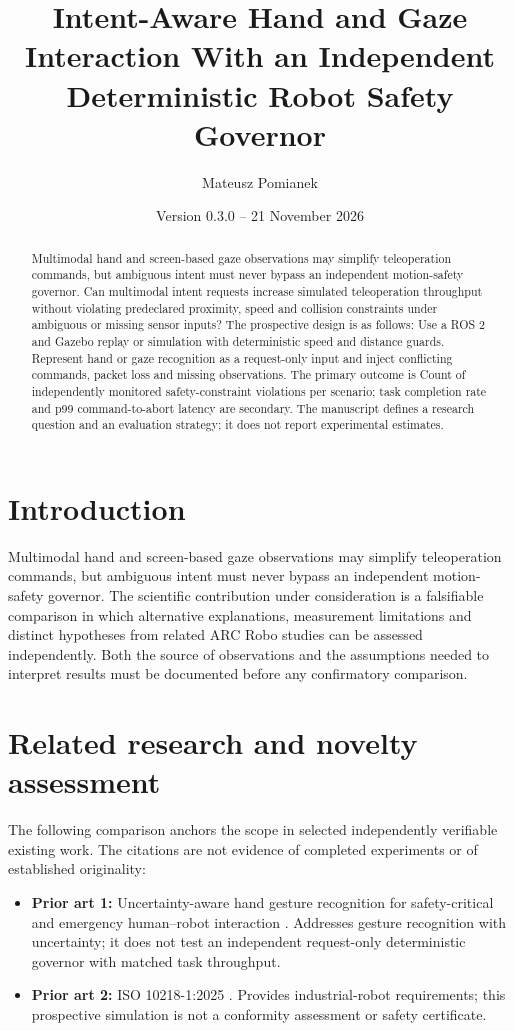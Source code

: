 \documentclass[11pt,a4paper]{article}
\title{Intent-Aware Hand and Gaze Interaction With an Independent Deterministic Robot Safety Governor}
\author{Mateusz Pomianek}
\date{Version 0.3.0 -- 21 November 2026}
\begin{document}
\maketitle

\begin{abstract}
Multimodal hand and screen-based gaze observations may simplify teleoperation commands, but ambiguous intent must never bypass an independent motion-safety governor. Can multimodal intent requests increase simulated teleoperation throughput without violating predeclared proximity, speed and collision constraints under ambiguous or missing sensor inputs? The prospective design is as follows: Use a ROS 2 and Gazebo replay or simulation with deterministic speed and distance guards. Represent hand or gaze recognition as a request-only input and inject conflicting commands, packet loss and missing observations. The primary outcome is Count of independently monitored safety-constraint violations per scenario; task completion rate and p99 command-to-abort latency are secondary. The manuscript defines a research question and an evaluation strategy; it does not report experimental estimates.
\end{abstract}

\section{Introduction}
Multimodal hand and screen-based gaze observations may simplify teleoperation commands, but ambiguous intent must never bypass an independent motion-safety governor. The scientific contribution under consideration is a falsifiable comparison in which alternative explanations, measurement limitations and distinct hypotheses from related ARC Robo studies can be assessed independently. Both the source of observations and the assumptions needed to interpret results must be documented before any confirmatory comparison.

\section{Related research and novelty assessment}
The following comparison anchors the scope in selected independently verifiable existing work. The citations are not evidence of completed experiments or of established originality:
\begin{itemize}
\item \textbf{Prior art 1:} Uncertainty-aware hand gesture recognition for safety-critical and emergency human--robot interaction \cite{source1}. Addresses gesture recognition with uncertainty; it does not test an independent request-only deterministic governor with matched task throughput.
\item \textbf{Prior art 2:} ISO 10218-1:2025 \cite{source2}. Provides industrial-robot requirements; this prospective simulation is not a conformity assessment or safety certificate.
\end{itemize}
\end{document}
